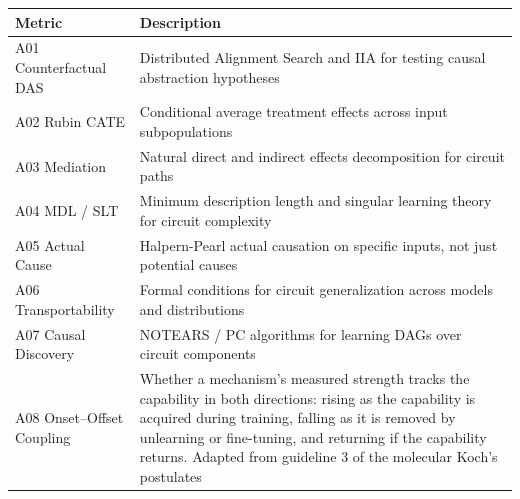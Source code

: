 \documentclass{article}
\begin{document}
\centering
\begin{tabular}{@{}lp{10cm}@{}}
\toprule
\textbf{Metric} & \textbf{Description} \\
\midrule
A01 Counterfactual DAS & Distributed Alignment Search and IIA for testing causal abstraction hypotheses \\
\midrule
A02 Rubin CATE & Conditional average treatment effects across input subpopulations \\
\midrule
A03 Mediation & Natural direct and indirect effects decomposition for circuit paths \\
\midrule
A04 MDL / SLT & Minimum description length and singular learning theory for circuit complexity \\
\midrule
A05 Actual Cause & Halpern-Pearl actual causation on specific inputs, not just potential causes \\
\midrule
A06 Transportability & Formal conditions for circuit generalization across models and distributions \\
\midrule
A07 Causal Discovery & NOTEARS / PC algorithms for learning DAGs over circuit components \\
\midrule
A08 Onset--Offset Coupling & Whether a mechanism's measured strength tracks the capability in both directions: rising as the capability is acquired during training, falling as it is removed by unlearning or fine-tuning, and returning if the capability returns. Adapted from guideline 3 of the molecular Koch's postulates \citep{fredricks1996sequence} \\
\bottomrule
\end{tabular}
\medskip
\end{document}

